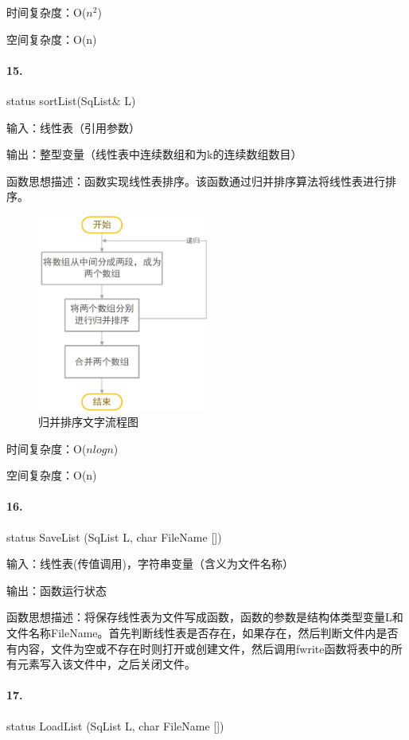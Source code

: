 \documentclass[supercite]{Experimental_Report}
\theoremstyle{definition}
\begin{document}
时间复杂度：O($n^{2}$)

空间复杂度：O(n)

\paragraph{15.}status sortList(SqList\& L)

输入：线性表（引用参数）

输出：整型变量（线性表中连续数组和为k的连续数组数目）

函数思想描述：函数实现线性表排序。该函数通过归并排序算法将线性表进行排序。

 \begin{figure}[H]
 	\centering
 	\includegraphics[width=0.5\textwidth]{images/归并排序.jpg}
 	\caption{归并排序文字流程图}
 	\label{txlab}
 \end{figure}


时间复杂度：O($nlogn$)

空间复杂度：O(n)

\paragraph{16.}status SaveList (SqList L, char FileName [])

输入：线性表(传值调用)，字符串变量（含义为文件名称）

输出：函数运行状态

函数思想描述：将保存线性表为文件写成函数，函数的参数是结构体类型变量L和文件名称FileName。首先判断线性表是否存在，如果存在，然后判断文件内是否有内容，文件为空或不存在时则打开或创建文件，然后调用fwrite函数将表中的所有元素写入该文件中，之后关闭文件。

\paragraph{17.}status LoadList (SqList L, char FileName [])
\end{document}
